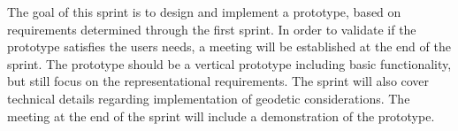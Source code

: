 The goal of this sprint is to design and implement a prototype, based on requirements determined through the first sprint. In order to validate if the prototype satisfies the users needs, a meeting will be established at the end of the sprint. The prototype should be a vertical prototype including basic functionality, but still focus on the representational requirements. The sprint will also cover technical details regarding implementation of geodetic considerations. The meeting at the end of the sprint will include a demonstration of the prototype.


